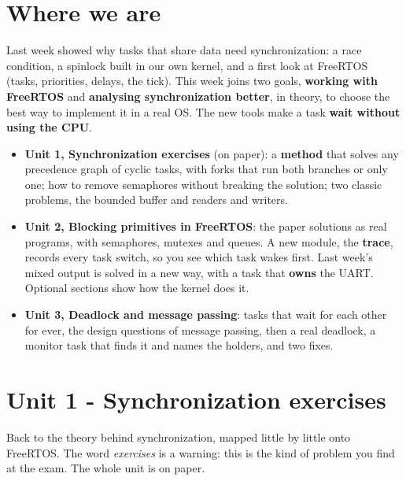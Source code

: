 \section{Where we are}
Last week showed why tasks that share data need synchronization: a race condition, a spinlock built in our own kernel, and a first look at FreeRTOS (tasks, priorities, delays, the tick). This week joins two goals, \textbf{working with FreeRTOS} and \textbf{analysing synchronization better}, in theory, to choose the best way to implement it in a real OS. The new tools make a task \textbf{wait without using the CPU}.
\begin{itemize}
    \item \textbf{Unit 1, Synchronization exercises} (on paper): a \textbf{method} that solves any precedence graph of cyclic tasks, with forks that run both branches or only one; how to remove semaphores without breaking the solution; two classic problems, the bounded buffer and readers and writers.
    \item \textbf{Unit 2, Blocking primitives in FreeRTOS}: the paper solutions as real programs, with semaphores, mutexes and queues. A new module, the \textbf{trace}, records every task switch, so you see which task wakes first. Last week's mixed output is solved in a new way, with a task that \textbf{owns} the UART. Optional sections show how the kernel does it.
    \item \textbf{Unit 3, Deadlock and message passing}: tasks that wait for each other for ever, the design questions of message passing, then a real deadlock, a monitor task that finds it and names the holders, and two fixes.
\end{itemize}

\section{Unit 1 - Synchronization exercises}
Back to the theory behind synchronization, mapped little by little onto FreeRTOS. The word \emph{exercises} is a warning: this is the kind of problem you find at the exam. The whole unit is on paper.

